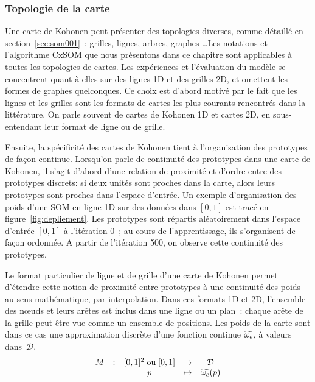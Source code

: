 \documentclass[../main]{subfiles}
\begin{document}
\subsubsection{Topologie de la carte}

Une carte de Kohonen peut présenter des topologies diverses, comme détaillé en section~\ref{sec:som001}~: grilles, lignes, arbres, graphes \dots Les notations et l'algorithme CxSOM que nous présentons dans ce chapitre sont applicables à toutes les topologies de cartes. Les expériences et l'évaluation du modèle se concentrent quant à elles sur des lignes 1D et des grilles 2D, et omettent les formes de graphes quelconques. Ce choix est d'abord motivé par le fait que les lignes et les grilles sont les formats de cartes les plus courants rencontrés dans la littérature. On parle souvent de cartes de Kohonen 1D et cartes 2D, en sous-entendant leur format de ligne ou de grille.

Ensuite, la spécificité des cartes de Kohonen tient à l'organisation des prototypes de façon continue. Lorsqu'on parle de continuité des prototypes dans une carte de Kohonen, il s'agit d'abord d'une relation de proximité et d'ordre entre des prototypes discrets: si deux unités sont proches dans la carte, alors leurs prototypes sont proches dans l'espace d'entrée. Un exemple d'organisation des poids d'une SOM en ligne 1D sur des données dans $[0,1]$ est tracé en figure~\ref{fig:depliement}. Les prototypes sont répartis aléatoirement dans l'espace d'entrée $[0,1]$ à l'itération $0$~; au cours de l'apprentissage, ils s'organisent de façon ordonnée. A partir de l'itération 500, on observe cette continuité des prototypes.

Le format particulier de ligne et de grille d'une carte de Kohonen permet d'étendre cette notion de proximité entre prototypes à une continuité des poids au sens mathématique, par interpolation. Dans ces formats 1D et 2D, l'ensemble des n\oe{}uds et leurs arêtes est inclus dans une ligne ou un plan~: chaque arête de la grille peut être vue comme un ensemble de positions. Les poids de la carte sont dans ce cas une approximation discrète d'une fonction continue $\widetilde{\omega_e}$, à valeurs dans~$\mathcal{D}$.
\begin{equation*}
\begin{array}{ccccc}
M& : & [0,1]^2 \; \text{ou} \;[0,1] & \to &  \mathcal{D} \\
 & & p & \mapsto & \widetilde{\omega_e}(p) \\
\end{array}
\end{equation*}
\end{document}
